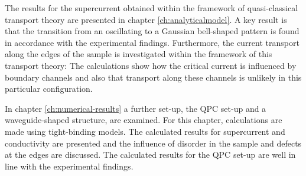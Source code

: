 The results for the supercurrent obtained within the framework of quasi-classical transport theory are presented in chapter \ref{ch:analyticalmodel}. A key result is that the transition from an oscillating to a Gaussian bell-shaped pattern is found in accordance with the experimental findings. Furthermore, the current transport along the edges of the sample is investigated within the framework of this transport theory: The calculations show how the critical current is influenced by boundary channels and also that transport along these channels is unlikely in this particular configuration.

In chapter \ref{ch:numerical-results} a further set-up, the QPC set-up and a waveguide-shaped structure, are examined. For this chapter, calculations are made using tight-binding models. The calculated results for supercurrent and conductivity are presented and the influence of disorder in the sample and defects at the edges are discussed. The calculated results for the QPC set-up are well in line with the experimental findings.
